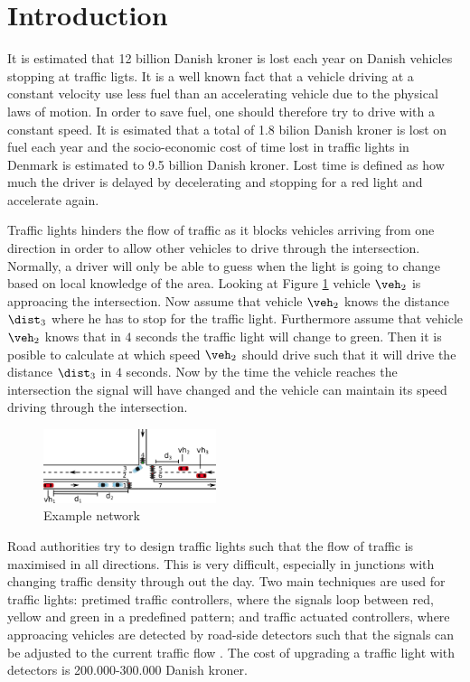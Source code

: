 \section{Introduction}
It is estimated that 12 billion Danish kroner is lost each year on Danish vehicles stopping at traffic ligts.\cite{Vejdir} %
It is a well known fact that a vehicle driving at a constant velocity use less fuel than an accelerating vehicle due to the physical laws of motion.
In order to save fuel, one should therefore try to drive with a constant speed.
It is esimated that a total of 1.8 bilion Danish kroner is lost on fuel each year and the socio-economic cost of time lost in traffic lights in Denmark is estimated to 9.5 billion Danish kroner. 
Lost time is defined as how much the driver is delayed by decelerating and stopping for a red light and accelerate again.

Traffic lights hinders the flow of traffic as it blocks vehicles arriving from one direction in order to allow other vehicles to drive through the intersection.
Normally, a driver will only be able to guess when the light is going to change based on local knowledge of the area. 
Looking at Figure \ref{fig:Introduction:network} vehicle $\veh_2$ is approacing the intersection.
Now assume that vehicle $\veh_2$ knows the distance $\dist_3$ where he has to stop for the traffic light. 
Furthermore assume that vehicle $\veh_2$ knows that in $4$ seconds the traffic light will change to green. 
Then it is posible to calculate at which speed $\veh_2$ should drive such that it will drive the distance $\dist_3$ in $4$ seconds. 
Now by the time the vehicle reaches the intersection the signal will have changed and the vehicle can maintain its speed driving through the intersection.
\begin{figure}[htb]
\centering
\includegraphics[width=0.45\textwidth]{../images/introNetwork.png}
\caption{Example network}
\label{fig:Introduction:network}
\end{figure}

Road authorities try to design traffic lights such that the flow of traffic is maximised in all directions.
This is very difficult, especially in junctions with changing traffic density through out the day.
Two main techniques are used for traffic lights: pretimed traffic controllers, where the signals loop between red, yellow and green in a predefined pattern; and traffic actuated controllers, where approacing vehicles are detected by road-side detectors such that the signals can be adjusted to the current traffic flow \cite{Vejdir}.
The cost of upgrading a traffic light with detectors is 200.000-300.000 Danish kroner\cite{Vejdir}.

